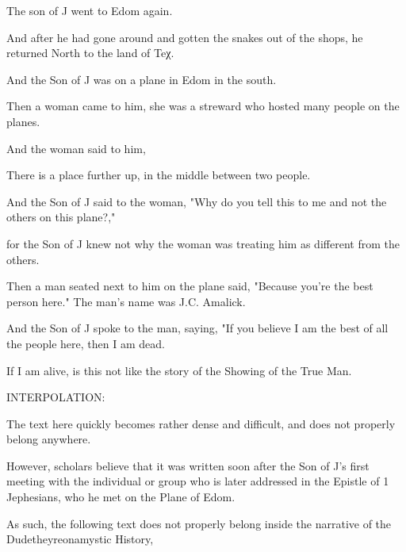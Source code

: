 
\Sentence
{ \hX{} }
{ \eX{} }
{
The son of J went to Edom again.
}

\Sentence
{ \hX{} }
{ \eX{} }
{
And after he had gone around and gotten the snakes out of the shops, he returned North to the land of Teχ.
}

\Sentence
{ \hX{} }
{ \eX{} }
{
And the Son of J was on a plane in Edom in the south.
}

\Sentence
{ \hX{} }
{ \eX{} }
{
Then a woman came to him, she was a streward who hosted many people on the planes.
}

\Sentence
{ \hX{} }
{ \eX{} }
{
And the woman said to him,
}

\Sentence
{ \hX{} }
{ \eX{} }
{
There is a place further up, in the middle between two people.
}

\Sentence
{ \hX{} }
{ \eX{} }
{
And the Son of J said to the woman, "Why do you tell this to me and not the others on this plane?,"
}

\Sentence
{ \hX{} }
{ \eX{} }
{
for the Son of J knew not why the woman was treating him as different from the others.
}

\Sentence
{ \hX{} }
{ \eX{} }
{
Then a man seated next to him on the plane said, "Because you're the best person here." The man's name was J.C. Amalick.
}

\Sentence
{ \hX{} }
{ \eX{} }
{
And the Son of J spoke to the man, saying, "If you believe I am the best of all the people here, then I am dead.
}

\Sentence
{ \hX{} }
{ \eX{} }
{
If I am alive, is this not like the story of the Showing of the True Man.
}

\Sentence
{ \hX{} }
{ \eX{} }
{
INTERPOLATION:
}

\Sentence
{ \hX{} }
{ \eX{} }
{
The text here quickly becomes rather dense and difficult, and does not properly belong anywhere.
}

\Sentence
{ \hX{} }
{ \eX{} }
{
However, scholars believe that it was written soon after the Son of J's first meeting with the individual or group who is later addressed in the Epistle of 1 Jephesians, who he met on the Plane of Edom.
}

\Sentence
{ \hX{} }
{ \eX{} }
{
As such, the following text does not properly belong inside the narrative of the Dudetheyreonamystic History,
}

